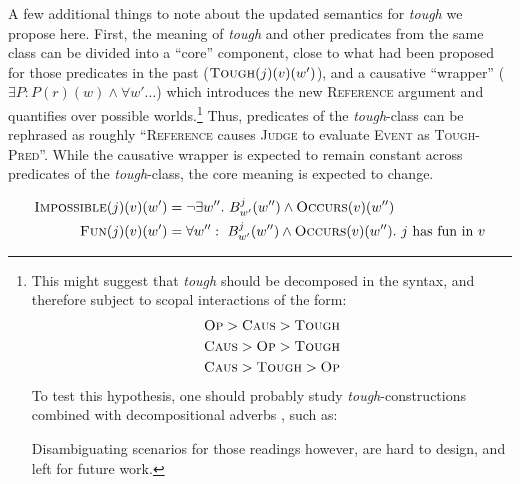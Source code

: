 \documentclass[11pt]{article}
\begin{document}
A few additional things to note about the updated semantics for \textit{tough} we propose here. First, the meaning of \textit{tough} and other predicates from the same class can be divided into a ``core'' component, close to what had been proposed for those predicates in the past ($\textsc{Tough}(j)(v)(w')$), and a causative ``wrapper'' ($\exists P: P(r)(w) \wedge \forall w' \dots$) which introduces the new \textsc{Reference} argument and quantifies over possible worlds.\footnote{This might suggest that \textit{tough} should be decomposed in the syntax, and therefore subject to scopal interactions of the form:
	\begin{align*}
		\textsc{Op} > \textsc{Caus} > \textsc{Tough}\\
		\textsc{Caus} > \textsc{Op} > \textsc{Tough}\\
		\textsc{Caus} > \textsc{Tough} > \textsc{Op}
	\end{align*}
	To test this hypothesis, one should probably study \textit{tough}-constructions combined with decompositional adverbs \cite{McCawley1971,Rapp1999}, such as:
	\begin{exe}
		\ex 
		\begin{xlist}
		\end{xlist}
	\end{exe}
	Disambiguating scenarios for those readings however, are hard to design, and left for future work.} Thus, predicates of the \textit{tough}-class can be rephrased as roughly  ``\textsc{Reference} causes \textsc{Judge} to evaluate \textsc{Event} as \textsc{Tough-Pred}''. While the causative wrapper is expected to remain constant across predicates of the \textit{tough}-class, the core meaning is expected to change.

\begin{align*}
	\textsc{Impossible}(j)(v)(w') &= \neg \exists w''. \ B^j_{w'}(w'') \wedge \textsc{Occurs}(v)(w'')\\
	\textsc{Fun}(j)(v)(w') &= \forall w'': \ B^j_{w'}(w'') \wedge \textsc{Occurs}(v)(w''). \ \text{$j$ has fun in $v$}
\end{align*}
\end{document}
